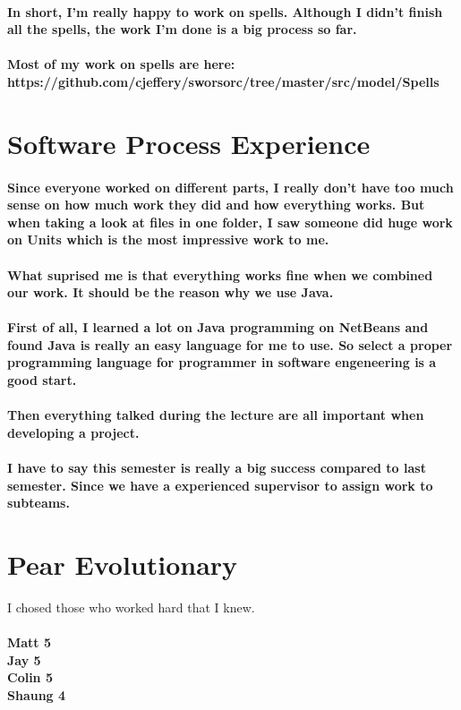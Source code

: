 \documentclass[12pt]{article}
\begin{document}
\paragraph{In short, I'm really happy to work on spells. Although I didn't finish all the spells, the work I'm done is a big process so far.}

\paragraph{Most of my work on spells are here: \\https://github.com/cjeffery/sworsorc/tree/master/src/model/Spells}

\section{Software Process Experience}
\paragraph{Since everyone worked on different parts, I really don't have too much sense on how much work they did and how everything works. But when taking a look at files in one folder, I saw someone did huge work on Units which is the most impressive work to me.}

\paragraph{What suprised me is that everything works fine when we combined our work. It should be the reason why we use Java.}

\paragraph{First of all, I learned a lot on Java programming on NetBeans and found Java is really an easy language for me to use. So select a proper programming language for programmer in software engeneering is a good start.}

\paragraph{Then everything talked during the lecture are all important when developing a project.}

\paragraph{I have to say this semester is really a big success compared to last semester. Since we have a experienced supervisor to assign work to subteams.}

 
\newpage
\section{Pear Evolutionary}
I chosed those who worked hard that I knew.
\paragraph{Matt	5\\Jay 5\\Colin 5\\Shaung 4}
\end{document}
